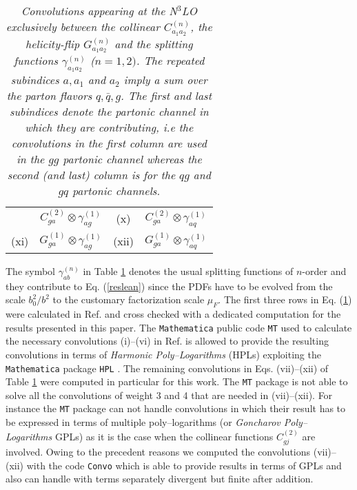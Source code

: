 \documentclass[12pt]{article}
\begin{document}
\begin{table}
\begin{center}
\begin{tabular}{ |c|c||c|c| }
& $C^{(2)}_{ga}\otimes\gamma^{(1)}_{ag}$

& \multirow{1}{*}{(x)} 

& $C^{(2)}_{ga}\otimes\gamma^{(1)}_{aq}$  \\
\multirow{1}{*}{(xi)} 

& $G^{(1)}_{ga}\otimes\gamma^{(1)}_{ag}$

& \multirow{1}{*}{(xii)} 

& $G^{(1)}_{ga}\otimes\gamma^{(1)}_{aq}$  \\
\hline
\end{tabular}
\caption{\label{Table:convosN3LO}
{\em Convolutions appearing at the N$^{3}$LO exclusively between the collinear $C^{(n)}_{a_{1}a_{2}}$, the helicity-flip $G^{(n)}_{a_{1}a_{2}}$ and the splitting functions $\gamma^{(n)}_{a_{1}a_{2}}$ ($n=1,2)$. The repeated subindices $a,a_{1}$ and $a_{2}$ imply a sum over the parton flavors $q,\bar{q},g$.  The first and last subindices denote the partonic channel in which they are contributing, i.e the convolutions in the first column are used in the $gg$ partonic channel whereas the second (and last) column is for the $qg$ and $gq$ partonic channels.
}}
\renewcommand{\arraystretch}{1}
\end{center}
\end{table}
The symbol $\gamma_{ab}^{(n)}$ in Table \ref{Table:convosN3LO} denotes the usual splitting functions of $n$-order and they contribute to Eq. (\ref{reslean}) since the PDFs have to be evolved from the scale $b_0^2/b^2$ to the customary factorization scale $\mu_{F}$.
The first three rows in Eq. (\ref{Table:convosN3LO}) were calculated in Ref. \cite{Hoschele:2012xc} and cross checked with a dedicated computation for the results presented in this paper. The \texttt{Mathematica} public code \texttt{MT} \cite{Hoeschele:2013gga} used to calculate the necessary convolutions (i)--(vi) in Ref. \cite{Hoschele:2012xc} is allowed to provide the resulting convolutions in terms of \textit{Harmonic Poly--Logarithms} (HPLs) \cite{Remiddi:1999ew} exploiting the \texttt{Mathematica} package \texttt{HPL} \cite{Maitre:2005uu}. 
The remaining convolutions in Eqs. (vii)--(xii) of Table \ref{Table:convosN3LO}  were computed in particular for this work. The \texttt{MT} \cite{Hoeschele:2013gga} package is not able to solve all the convolutions of weight 3 and 4 that are needed in (vii)--(xii). For instance the \texttt{MT} package can not handle convolutions in which their result has to be expressed in terms of multiple poly--logarithms (or {\em Goncharov Poly--Logarithms} GPLs) \cite{Goncharov:1998kja,Goncharov:2001iea} as it is the case when the collinear functions $C^{(2)}_{gj}$ are involved. Owing to the precedent reasons we computed the convolutions (vii)--(xii) with the code \texttt{Convo} which is able to provide results in terms of GPLs and also can handle with terms  separately divergent but finite after addition.
\end{document}
